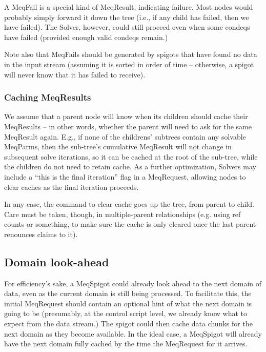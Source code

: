 \documentclass[12pt]{article}
\begin{document}
  A MeqFail is a special kind of MeqResult, indicating failure. Most nodes
  would probably simply forward it down the tree (i.e., if any child has
  failed, then we have failed). The Solver, however, could still proceed even
  when some condeqs have failed (provided enough valid condeqs remain.)
  
  Note also that MeqFails should be generated by spigots that have found no
  data in the input stream (assuming it is sorted in order of time -- otherwise,
  a spigot will never know that it has failed to receive).

\subsubsection{Caching MeqResults}

  We assume that a parent node will know when its children should cache their
  MeqResults -- in other words, whether the parent will need to ask for the
  same MeqResult again. E.g., if none of the childrens' subtrees contain any
  solvable MeqParms, then the sub-tree's cumulative MeqResult will not change
  in subsequent solve iterations, so it can be cached at the root of the
  sub-tree, while the children do not need to retain cache. As a further
  optimization, Solvers may include a ``this is the final iteration'' flag in a
  MeqRequest, allowing nodes to clear caches as the final iteration proceeds.

  In any case, the command to clear cache goes up the tree, from parent to
  child. Care must be taken, though, in multiple-parent relationships (e.g.
  using ref counts or something, to make sure the cache is only cleared once
  the last parent renounces claims to it).

\subsection{Domain look-ahead}
  
  For efficiency's sake, a MeqSpigot could already look ahead to the next
  domain of data, even as the current domain is still being processed. To
  facilitate this, the initial MeqRequest should contain an optional hint of
  what the next domain is going to be (presumably, at the control script level,
  we already know what to expect from the data stream.) The spigot could then
  cache data chunks for the next domain as they become available. In the ideal
  case, a MeqSpigot will already have the next domain fully cached by the time
  the MeqRequest for it arrives.
  
\end{document}
